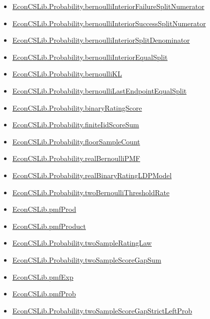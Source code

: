 \documentclass[10pt]{article}
\begin{document}
\begin{itemize}[leftmargin=1.2em]
\begin{itemize}[leftmargin=1.2em]
\item \hyperlink{library-prerequisite-c4d922c1dbf3d0a6}{EconCSLib.Probability.bernoulliInteriorFailureSplitNumerator}
\item \hyperlink{library-prerequisite-48bd8c17f399b1fc}{EconCSLib.Probability.bernoulliInteriorSuccessSplitNumerator}
\item \hyperlink{library-prerequisite-17d704ff7a24219b}{EconCSLib.Probability.bernoulliInteriorSplitDenominator}
\item \hyperlink{library-prerequisite-57b352998b6e4a14}{EconCSLib.Probability.bernoulliInteriorEqualSplit}
\item \hyperlink{library-prerequisite-ca060c260b48fe49}{EconCSLib.Probability.bernoulliKL}
\item \hyperlink{library-prerequisite-2735ba3861b2f309}{EconCSLib.Probability.bernoulliLastEndpointEqualSplit}
\item \hyperlink{library-prerequisite-4cea2ad3a0ac0028}{EconCSLib.Probability.binaryRatingScore}
\item \hyperlink{library-prerequisite-e0e20858ab2c39b5}{EconCSLib.Probability.finiteIidScoreSum}
\item \hyperlink{library-prerequisite-f584f3b3a668a101}{EconCSLib.Probability.floorSampleCount}
\item \hyperlink{library-prerequisite-b6ce97a274cbdb86}{EconCSLib.Probability.realBernoulliPMF}
\item \hyperlink{library-prerequisite-342012c3b44e591d}{EconCSLib.Probability.realBinaryRatingLDPModel}
\item \hyperlink{library-prerequisite-10ffb019e9ff740e}{EconCSLib.Probability.twoBernoulliThresholdRate}
\item \hyperlink{library-prerequisite-f185c8e6394c9317}{EconCSLib.pmfProd}
\item \hyperlink{library-prerequisite-38eb9a31a47bfbd9}{EconCSLib.pmfProduct}
\item \hyperlink{library-prerequisite-59131a14024b99ca}{EconCSLib.Probability.twoSampleRatingLaw}
\item \hyperlink{library-prerequisite-0777cfce9fa4aa84}{EconCSLib.Probability.twoSampleScoreGapSum}
\item \hyperlink{library-prerequisite-e5c7eedc40c11b7a}{EconCSLib.pmfExp}
\item \hyperlink{library-prerequisite-7fec9dedef722fc8}{EconCSLib.pmfProb}
\item \hyperlink{library-prerequisite-7977d3effede269a}{EconCSLib.Probability.twoSampleScoreGapStrictLeftProb}

\end{itemize}
\end{itemize}
\end{document}
